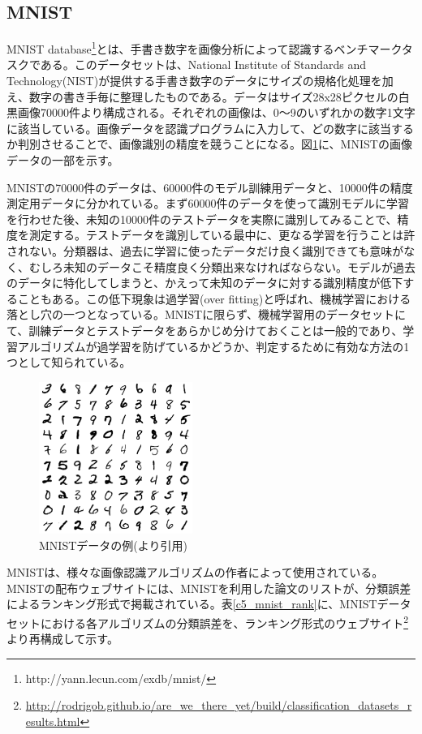 \subsection{MNIST}
MNIST database\footnote{http://yann.lecun.com/exdb/mnist/}とは、手書き数字を画像分析によって認識するベンチマークタスクである。このデータセットは、National Institute of Standards and Technology(NIST)が提供する手書き数字のデータにサイズの規格化処理を加え、数字の書き手毎に整理したものである。データはサイズ28x28ピクセルの白黒画像70000件より構成される\cite{lecun1998gradient-based}。それぞれの画像は、0〜9のいずれかの数字1文字に該当している。画像データを認識プログラムに入力して、どの数字に該当するか判別させることで、画像識別の精度を競うことになる。図\ref{c5_mnist_ex}に、MNISTの画像データの一部を示す。\par
MNISTの70000件のデータは、60000件のモデル訓練用データと、10000件の精度測定用データに分かれている。まず60000件のデータを使って識別モデルに学習を行わせた後、未知の10000件のテストデータを実際に識別してみることで、精度を測定する。テストデータを識別している最中に、更なる学習を行うことは許されない。分類器は、過去に学習に使ったデータだけ良く識別できても意味がなく、むしろ未知のデータこそ精度良く分類出来なければならない。モデルが過去のデータに特化してしまうと、かえって未知のデータに対する識別精度が低下することもある。この低下現象は過学習(over fitting)と呼ばれ、機械学習における落とし穴の一つとなっている。MNISTに限らず、機械学習用のデータセットにて、訓練データとテストデータをあらかじめ分けておくことは一般的であり、学習アルゴリズムが過学習を防げているかどうか、判定するために有効な方法の1つとして知られている。\par
\begin{figure}[tbp]
 \begin{center}
  \includegraphics[width=50mm]{img/c5/mnist_ex}
 \end{center}
 \caption{MNISTデータの例(\cite{lecun1998gradient-based}より引用)}
 \label{c5_mnist_ex}
\end{figure}
MNISTは、様々な画像認識アルゴリズムの作者によって使用されている。MNISTの配布ウェブサイトには、MNISTを利用した論文のリストが、分類誤差によるランキング形式で掲載されている。表\ref{c5_mnist_rank}に、MNISTデータセットにおける各アルゴリズムの分類誤差を、ランキング形式のウェブサイト\footnote{\label{c5_rank}\url{http://rodrigob.github.io/are_we_there_yet/build/classification_datasets_results.html}}より再構成して示す。

